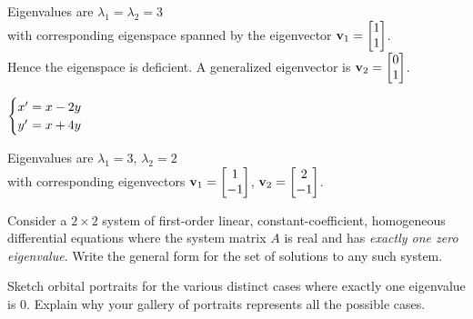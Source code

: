 \documentclass[boxes,printing,blanks,hmc]{gsypset}
\begin{document}
\begin{problem}
\begin{subproblems}
			Eigenvalues are $\lambda_1 = \lambda_2 = 3$ \\
			with corresponding eigenspace spanned by the eigenvector $\mathbf{v}_1 = \begin{bmatrix}1 \\1\end{bmatrix}$. \\
			Hence the eigenspace is deficient. 
			A generalized eigenvector is $\mathbf{v}_2 = \begin{bmatrix}0 \\1\end{bmatrix}$.
			\begin{solution}
				
			\end{solution}
		\subproblem 
			$\begin{cases}
				x'&\hspace{-.1in}=x-2y \\
				y'&\hspace{-.1in}=x+4y
			\end{cases}$
			
			Eigenvalues are $\lambda_1 = 3$, $\lambda_2 = 2$ \\
			with corresponding eigenvectors $\mathbf{v}_1 = \begin{bmatrix}1 \\ -1\end{bmatrix}$, $\mathbf{v}_2 = \begin{bmatrix}2 \\ -1\end{bmatrix}$.
			\begin{solution}
				
			\end{solution}
	\end{subproblems}
\end{problem}

\begin{problem} 
	\begin{subproblems}
		\subproblem 
			Consider a $2\times 2$ system of first-order linear, constant-coefficient, 
			homogeneous differential equations where the system matrix $A$ is real and 
			has \textit{exactly one zero eigenvalue}. 
		  Write the general form for the set of solutions to any such system.
			\begin{solution}
				
			\end{solution}
		\subproblem 
			Sketch orbital portraits for the various distinct cases where exactly one eigenvalue is $0$. 
		  Explain why your gallery of portraits represents all the possible cases.
			\begin{solution}
				
			\end{solution}
	\end{subproblems}
\end{problem}
\end{document}
